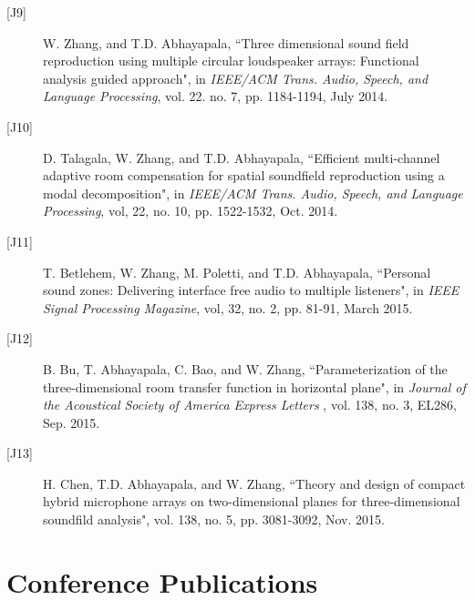 \documentclass[10pt]{article}
\begin{document}
\begin{description}
\item[{[}J9{]}]W. Zhang, and T.D. Abhayapala, ``Three dimensional sound field reproduction using multiple circular loudspeaker arrays: Functional analysis guided approach", in {\em IEEE/ACM Trans. Audio, Speech, and Language Processing}, vol. 22. no. 7, pp. 1184-1194, July 2014.

\item[{[}J10{]}]D. Talagala, W. Zhang, and T.D. Abhayapala, ``Efficient multi-channel adaptive room compensation for spatial soundfield reproduction using a modal decomposition", in {\em IEEE/ACM Trans. Audio, Speech, and Language Processing},  vol, 22, no. 10, pp. 1522-1532, Oct. 2014.

\item[{[}J11{]}]T. Betlehem, W. Zhang, M. Poletti, and T.D. Abhayapala, ``Personal sound zones: Delivering interface free audio to multiple listeners", in {\em IEEE Signal Processing Magazine}, vol, 32, no. 2, pp. 81-91, March 2015.

\item[{[}J12{]}]B. Bu, T. Abhayapala, C. Bao, and W. Zhang, ``Parameterization of the three-dimensional room transfer function in horizontal plane", in {\em Journal of the Acoustical Society of America Express Letters} , vol. 138, no. 3, EL286, Sep. 2015.

\item[{[}J13{]}]H. Chen, T.D. Abhayapala, and W. Zhang, ``Theory and design of compact hybrid microphone arrays on two-dimensional planes for three-dimensional soundfild analysis", vol. 138, no. 5, pp. 3081-3092, Nov. 2015.


\end{description}



\section*{Conference Publications}
\end{document}

